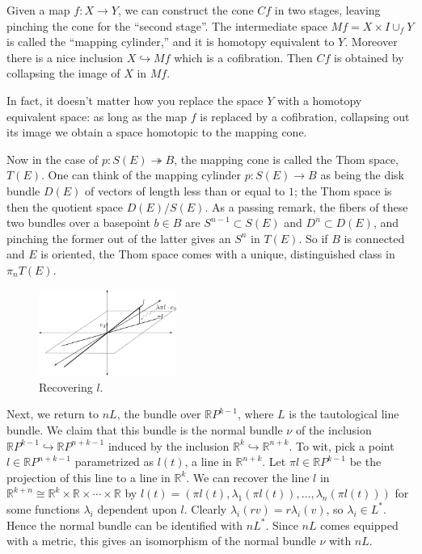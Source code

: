 \documentclass{article}
\newcommand{\R}{\mathbb{R}}
\newcommand{\RP}{\R P}
\newcommand{\into}{\hookrightarrow}
\newcommand{\onto}{\twoheadrightarrow}
\begin{document}
Given a map $f:X\to Y$, we can construct the cone $Cf$ in two stages, leaving pinching the cone for the ``second stage''. The intermediate space $Mf=X\times I\cup_f Y$ is called the ``mapping cylinder,'' and it is homotopy equivalent to $Y$.  Moreover there is a nice inclusion $X \into Mf$ which is a cofibration. Then $Cf$ is obtained by collapsing the image of $X$ in $Mf$.

In fact, it doesn't matter how you replace the space $Y$ with a homotopy equivalent space: as long as the map $f$ is replaced by a cofibration, collapsing out its image we obtain a space homotopic to the mapping cone.

Now in the case of $p: S(E) \onto B$, the mapping cone is called the Thom space, $T(E)$. 
One can think of the mapping cylinder $p:S(E)\to B$ as being the disk bundle $D(E)$ of vectors of length less than or equal to $1$; the Thom space is then the quotient space $D(E) / S(E)$.  As a passing remark, the fibers of these two bundles over a basepoint $b \in B$ are $S^{n-1} \subset S(E)$ and $D^n \subset D(E)$, and pinching the former out of the latter gives an $S^n$ in $T(E)$.  So if $B$ is connected and $E$ is oriented, the Thom space comes with a unique, distinguished class in $\pi_n T(E)$.

\begin{figure}
\centering\includegraphics[width=0.4\textwidth]{figures/fig8.pdf}
\caption{\small Recovering $l$.}
\end{figure} %
Next, we return to $nL$, the bundle over $\RP^{k-1}$, where $L$ is the tautological line bundle.  We claim that this bundle is the normal bundle $\nu$ of the inclusion $\RP^{k-1} \into \RP^{n+k-1}$ induced by the inclusion $\R^k \into \R^{n+k}$.  To wit, pick a point $l \in \RP^{n+k-1}$ parametrized as $l(t)$, a line in $\R^{n+k}$.  Let $\pi l \in \RP^{k-1}$ be the projection of this line to a line in $\R^k$.  We can recover the line $l$ in $\R^{k+n} \cong \R^k \times \R \times \cdots \times \R$ by $l(t) = (\pi l(t), \lambda_1(\pi l(t)), \ldots, \lambda_n(\pi l(t)))$ for some functions $\lambda_i$ dependent upon $l$.  Clearly $\lambda_i(rv) = r \lambda_i(v)$, so $\lambda_i \in L^*$.  Hence the normal bundle can be identified with $nL^*$.  Since $nL$ comes equipped with a metric, this gives an isomorphism of the normal bundle $\nu$ with $nL$.
\end{document}
